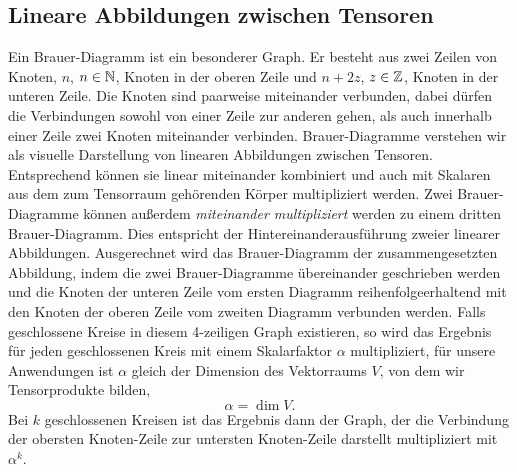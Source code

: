 \subsection{Lineare Abbildungen zwischen Tensoren}
\begin{definition}
	Ein Brauer-Diagramm ist ein besonderer Graph. Er besteht aus zwei Zeilen von Knoten, $n$, $n\in\mathbb{N}$, Knoten in der oberen Zeile und $n+2z$, $z\in\mathbb{Z}$, Knoten in der unteren Zeile. Die Knoten sind paarweise miteinander verbunden, dabei dürfen die Verbindungen sowohl von einer Zeile zur anderen gehen, als auch innerhalb einer Zeile zwei Knoten miteinander verbinden.
	Brauer-Diagramme verstehen wir als visuelle Darstellung von linearen Abbildungen zwischen Tensoren. Entsprechend können sie linear miteinander kombiniert und auch mit Skalaren aus dem zum Tensorraum gehörenden Körper multipliziert werden.
	Zwei Brauer-Diagramme können außerdem \emph{miteinander multipliziert} werden zu einem dritten Brauer-Diagramm. Dies entspricht der Hintereinanderausführung zweier linearer Abbildungen. Ausgerechnet wird das Brauer-Diagramm der zusammengesetzten Abbildung, indem die zwei Brauer-Diagramme übereinander geschrieben werden und die Knoten der unteren Zeile vom ersten Diagramm reihenfolgeerhaltend mit den Knoten der oberen Zeile vom zweiten Diagramm verbunden werden. Falls geschlossene Kreise in diesem 4-zeiligen Graph existieren, so wird das Ergebnis für jeden geschlossenen Kreis mit einem Skalarfaktor $\alpha$ multipliziert, für unsere Anwendungen ist $\alpha$ gleich der Dimension des Vektorraums $V$, von dem wir Tensorprodukte bilden,
	\[\alpha = \dim{V}.\]
	 Bei $k$ geschlossenen Kreisen ist das Ergebnis dann der Graph, der die Verbindung der obersten Knoten-Zeile zur untersten Knoten-Zeile darstellt multipliziert mit $\alpha^k$.
\end{definition}
